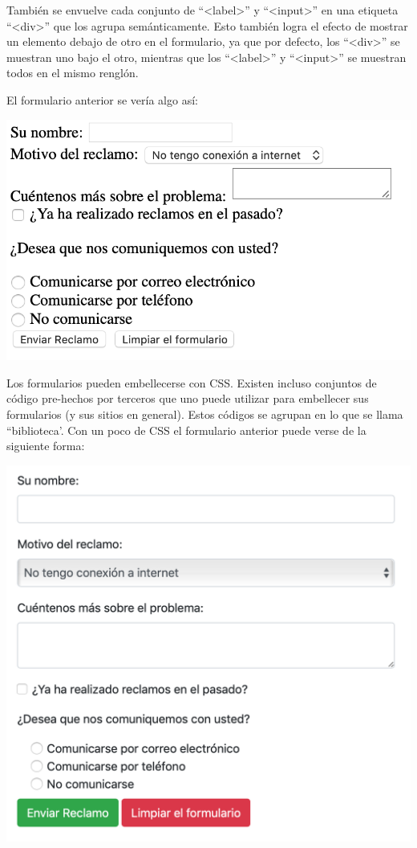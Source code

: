 También se envuelve cada conjunto de ``<label>'' y ``<input>'' en una
etiqueta ``<div>'' que los agrupa semánticamente. Esto también logra el
efecto de mostrar un elemento debajo de otro en el formulario, ya que por
defecto, los ``<div>'' se muestran uno bajo el otro, mientras que los
``<label>'' y ``<input>'' se muestran todos en el mismo renglón.

El formulario anterior se vería algo así:

\includegraphics[scale=0.7]{anexos/html/imagenes/form_sample_no_css.png}

Los formularios pueden embellecerse con CSS. Existen incluso conjuntos de código
pre-hechos por terceros que uno puede utilizar para embellecer sus formularios
(y sus sitios en general). Estos códigos se agrupan en lo que se llama ``biblioteca'.
Con un poco de CSS el formulario anterior puede verse de la siguiente forma:

\centerline{\includegraphics[scale=0.5]{anexos/html/imagenes/form_sample_css.png}}

